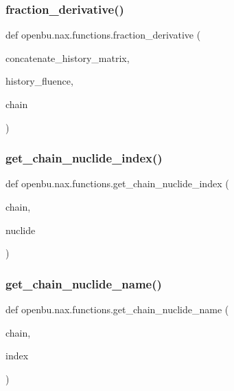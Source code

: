 \subsubsection{\texorpdfstring{fraction\+\_\+derivative()}{fraction\_derivative()}}
{\footnotesize\ttfamily def openbu.\+nax.\+functions.\+fraction\+\_\+derivative (\begin{DoxyParamCaption}\item[{}]{concatenate\+\_\+history\+\_\+matrix,  }\item[{}]{history\+\_\+fluence,  }\item[{}]{chain }\end{DoxyParamCaption})}

\mbox{\label{namespaceopenbu_1_1nax_1_1functions_a80ac9bb47ee25089fc0ded4c832739dd}} 
\subsubsection{\texorpdfstring{get\+\_\+chain\+\_\+nuclide\+\_\+index()}{get\_chain\_nuclide\_index()}}
{\footnotesize\ttfamily def openbu.\+nax.\+functions.\+get\+\_\+chain\+\_\+nuclide\+\_\+index (\begin{DoxyParamCaption}\item[{}]{chain,  }\item[{}]{nuclide }\end{DoxyParamCaption})}

\mbox{\label{namespaceopenbu_1_1nax_1_1functions_ab283cd29cc591de506a00fd3445d3286}} 
\subsubsection{\texorpdfstring{get\+\_\+chain\+\_\+nuclide\+\_\+name()}{get\_chain\_nuclide\_name()}}
{\footnotesize\ttfamily def openbu.\+nax.\+functions.\+get\+\_\+chain\+\_\+nuclide\+\_\+name (\begin{DoxyParamCaption}\item[{}]{chain,  }\item[{}]{index }\end{DoxyParamCaption})}

